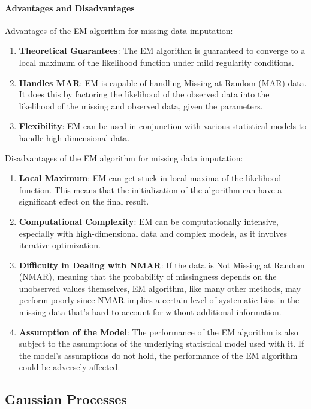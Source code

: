 \documentclass[a4paper,12pt,twoside,openright]{report}
\begin{document}
\paragraph{Advantages and Disadvantages} Advantages of the EM algorithm for missing data imputation:

\begin{enumerate}
    \item \textbf{Theoretical Guarantees}: The EM algorithm is guaranteed to converge to a local maximum of the likelihood function under mild regularity conditions.
    \item \textbf{Handles MAR}: EM is capable of handling Missing at Random (MAR) data. It does this by factoring the likelihood of the observed data into the likelihood of the missing and observed data, given the parameters.
    \item \textbf{Flexibility}: EM can be used in conjunction with various statistical models to handle high-dimensional data.
\end{enumerate}

Disadvantages of the EM algorithm for missing data imputation:

\begin{enumerate}
    \item \textbf{Local Maximum}: EM can get stuck in local maxima of the likelihood function. This means that the initialization of the algorithm can have a significant effect on the final result.
    \item \textbf{Computational Complexity}: EM can be computationally intensive, especially with high-dimensional data and complex models, as it involves iterative optimization.
    \item \textbf{Difficulty in Dealing with NMAR}: If the data is Not Missing at Random (NMAR), meaning that the probability of missingness depends on the unobserved values themselves, EM algorithm, like many other methods, may perform poorly since NMAR implies a certain level of systematic bias in the missing data that's hard to account for without additional information.
    \item \textbf{Assumption of the Model}: The performance of the EM algorithm is also subject to the assumptions of the underlying statistical model used with it. If the model's assumptions do not hold, the performance of the EM algorithm could be adversely affected.
\end{enumerate}

\subsection{Gaussian Processes}
\end{document}
